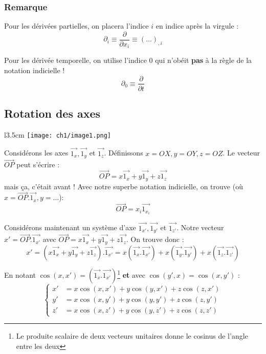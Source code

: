         \subsubsection{Remarque}
        Pour les dérivées partielles, on placera l'indice $i$ en indice après la virgule :
        \begin{equation}
        \partial_i \equiv \frac{\partial}{\partial x_i} \equiv (\dots)_{,i}
        \end{equation}
        
        Pour les dérivée temporelle, on utilise l'indice 0 qui n'obéit \textbf{pas} à la
        règle de la notation indicielle ! 
        \begin{equation}
        \partial_0 \equiv \frac{\partial}{\partial t}
        \end{equation}


    \newpage
    \subsection{Rotation des axes}
    \begin{wrapfigure}[7]{l}{3.5cm}
    \texttt{[image: ch1/image1.png]}
    \end{wrapfigure}
    Considérons les axes $\vec{1_x}, \vec{1_y}$ et $\vec{1_z}$. Définissons $x = OX, y = OY, 
    z = OZ$. Le vecteur $\vec{OP}$ peut s'écrire :
    \begin{equation}
    \vec{OP} = x\vec{1_x} + y\vec{1_y}+z\vec{1_z}
    \end{equation}
    mais ça, c'était avant ! Avec notre superbe notation indicielle, on trouve (où $x = \vec{OP}.
    \vec{1_x}, y = \dots$):
    \begin{equation}
    \vec{OP} = x_i\vec{1_{x_i}}
    \end{equation}
    
    Considérons maintenant un système d'axe $\vec{1_{x'}}, \vec{1_{y'}}$ et $\vec{1_{z'}}$. Notre
    vecteur $x' = \vec{OP}.\vec{1_{x'}}$ avec $\vec{OP} = x\vec{1_x} + y\vec{1_y}+z\vec{1_z}$. On
    trouve donc :
    \begin{equation}
    x' = ( x\vec{1_x} + y\vec{1_y}+z\vec{1_z}).\vec{1_{x'}} = x(\vec{1_x}.\vec{1_{x'}}) + x(\vec{1_y}
    .\vec{1_{y'}}) + x(\vec{1_z}.\vec{1_{z'}})
    \end{equation}
    
    En notant $\cos(x,x') = (\vec{1_x}.\vec{1_{x'}})$\footnote{Le produite scalaire de deux vecteurs
    unitaires donne le cosinus de l'angle entre les deux} \textbf{et} avec $\cos(y',x) = \cos(x,y')$ :
    \begin{equation}
    \left\{\begin{array}{ll}
     x' &=  x\cos(x,x') + y\cos(y,x') + z\cos(z,x')\\
     y' &=  x\cos(x,y') + y\cos(y,y') + z\cos(z,y')\\ 
     z' &=  x\cos(x,z') + y\cos(y,z') + z\cos(z,z')
    \end{array}\right.
    \end{equation}
    
